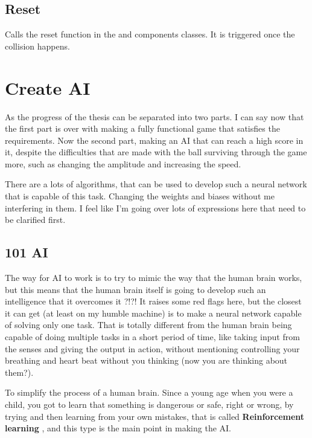 \subsection{Reset}
Calls the reset function in the  and  components classes. It is triggered once the collision happens.

\section{Create AI}\label{create-ai}

As the progress of the thesis can be separated into two parts. I can say now that the first part is over with making a fully functional game that satisfies the requirements. Now the second part, making an AI that can reach a high score in it, despite the difficulties that are made with the ball surviving through the game more, such as changing the amplitude and increasing the speed.

There are a lots of algorithms, that can be used to develop such a neural network that is capable of this task. Changing the weights and biases without me interfering in them. I feel like I'm going over lots of expressions here that need to be clarified first.

\subsection{101 AI}\label{sec:101-ai}
The way for AI to work is to try to mimic the way that the human brain works, but this means that the human brain itself is going to develop such an intelligence that it overcomes it ?!?! It raises some red flags here, but the closest it can get (at least on my humble machine) is to make a neural network capable of solving only one task. That is totally different from the human brain being capable of doing multiple tasks in a short period of time, like taking input from the senses and giving the output in action, without mentioning controlling your breathing and heart beat without you thinking (now you are thinking about them?).

To simplify the process of a human brain. Since a young age when you were a child, you got to learn that something is dangerous or safe, right or wrong, by trying and then learning from your own mistakes, that is called \textbf{Reinforcement learning} , and this type is the main point in making the AI.

